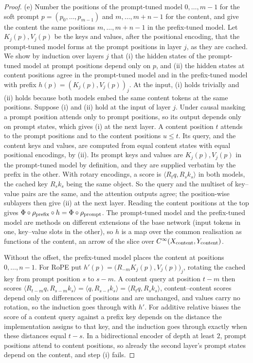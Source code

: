 \begin{proof}
(e) Number the positions of the prompt-tuned model $0,\dots,m-1$ for the soft prompt $p=(p_0,\dots,p_{m-1})$ and $m,\dots,m+n-1$
for the content, and give the content the same positions $m,\dots,m+n-1$ in the prefix-tuned model. Let $K_j(p),V_j(p)$ be the
keys and values, after the positional encoding, that the prompt-tuned model forms at the prompt positions in layer $j$, as they
are cached. We show by induction over layers $j$ that (i) the hidden states of the prompt-tuned model at prompt positions
depend only on $p$, and (ii) the hidden states at content positions agree in the prompt-tuned model and in the prefix-tuned
model with prefix $h(p)=(K_j(p),V_j(p))_j$. At the input, (i) holds trivially and (ii) holds because both models embed the same
content tokens at the same positions. Suppose (i) and (ii) hold at the input of layer $j$. Under causal masking a prompt
position attends only to prompt positions, so its output depends only on prompt states, which gives (i) at the next layer. A
content position $t$ attends to the prompt positions and to the content positions $u\le t$. Its query, and the content keys
and values, are computed from equal content states with equal positional encodings, by (ii). Its prompt keys and values are
$K_j(p),V_j(p)$ in the prompt-tuned model by definition, and they are supplied verbatim by the prefix in the other. With
rotary encodings, a score is $\langle R_tq,R_sk_s\rangle$ in both models, the cached key $R_sk_s$ being the same object. So the
query and the multiset of key--value pairs are the same, and the attention outputs agree; the position-wise sublayers then give
(ii) at the next layer. Reading the content positions at the top gives $\Phi\circ\rho_{\rm prefix}\circ h=\Phi\circ
\rho_{\rm prompt}$. The prompt-tuned model and the prefix-tuned model are methods on different extensions of the base network
(input tokens in one, key--value slots in the other), so $h$ is a map over the common realisation as functions of the content,
an arrow of the slice over $C^\infty(X_{\rm content},Y_{\rm content})$.

Without the offset, the prefix-tuned model places the content at positions $0,\dots,n-1$. For RoPE put
$h'(p)=\big(R_{-m}K_j(p),V_j(p)\big)_j$, rotating the cached key from prompt position $s$ to $s-m$. A content query at position
$t-m$ then scores $\langle R_{t-m}q,R_{s-m}k_s\rangle=\langle q,R_{s-t}k_s\rangle=\langle R_tq,R_sk_s\rangle$, content--content
scores depend only on differences of positions and are unchanged, and values carry no rotation, so the induction goes through
with $h'$. For additive relative biases the score of a content query against a prefix key depends on the distance the
implementation assigns to that key, and the induction goes through exactly when these distances equal $t-s$. In a bidirectional
encoder of depth at least $2$, prompt positions attend to content positions, so already the second layer's prompt states depend on
the content, and step (i) fails.


\end{proof}
